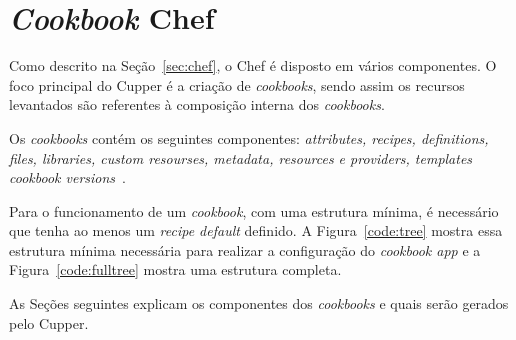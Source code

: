 \section{\textit{Cookbook} Chef}
\label{sec:lev-rec}

Como descrito na Seção~\ref{sec:chef}, o Chef é disposto em vários
componentes. O foco principal do Cupper é a criação de \textit{cookbooks},
sendo assim os recursos levantados são referentes à composição interna
dos \textit{cookbooks}.

Os \textit{cookbooks} contém os seguintes componentes: \textit{attributes, recipes, definitions,
files, libraries, custom resourses, metadata, resources e providers, templates
cookbook versions}~\cite{chefdoc:2016}.

Para o funcionamento de um \textit{cookbook}, com uma estrutura mínima, é necessário que tenha
ao menos um \textit{recipe default} definido. A Figura~\ref{code:tree} mostra essa
estrutura mínima necessária para realizar a configuração do \textit{cookbook app} e a Figura~\ref{code:fulltree} mostra uma estrutura completa.

\renewcommand{\lstlistingname}{Figura}

\noindent\begin{minipage}{.45\textwidth}
  
\end{minipage}\hfill
\noindent\begin{minipage}{.45\textwidth}
  
\end{minipage}

\renewcommand{\lstlistingname}{Código}

As Seções seguintes explicam os componentes dos \textit{cookbooks} e quais serão gerados
pelo Cupper.

%

%

%
%
%

%
